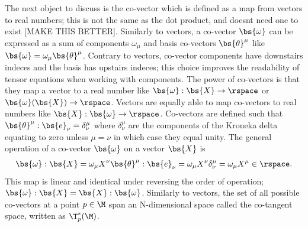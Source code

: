 The next object to discuss is the co-vector which is defined as a map from vectors to real numbers; this is not the same as the dot product, and doesnt need one to exist [MAKE THIS BETTER]. Similarly to vectors, a co-vector $\bs{\omega}$ can be expressed as a sum of components $\omega_\mu$ and basis co-vectors $\bs{\theta}^\mu$ like $\bs{\omega} = \omega_\mu \bs{\theta}^\mu$. Contrary to vectors, co-vector components have downstairs indeces and the basis has upstairs indeces; this choice improves the readability of tensor equations when working with components. The power of co-vectors is that they map a vector to a real number like $\bs{\omega}:\bs{X} \rightarrow \rspace$ or $\bs{\omega}(\bs{X}) \rightarrow \rspace$. Vectors are equally able to map co-vectors to real numbers like $\bs{X}:\bs{\omega}\rightarrow\rspace$. Co-vectors are defined such that $\bs{\theta}^\mu : \bs{e}_\nu = \delta^\mu_\nu$ where $\delta^\mu_\nu$ are the components of the Kroneka delta equating to zero unless $\mu=\nu$ in which case they equal unity. The general operation of a co-vector $\bs{\omega}$ on a vector $\bs{X}$ is
\begin{equation}
\bs{\omega}: \bs{X} = \omega_\mu X^\nu \bs{\theta}^\mu:\bs{e}_\nu = \omega_\mu X^\nu \delta^\mu_\nu = \omega_\mu X^\mu \in \rspace.
\end{equation}
This map is linear and identical under reversing the order of operation; $\bs{\omega} : \bs{X} = \bs{X} : \bs{\omega}$. Similarly to vectors, the set of all possible co-vectors at a point $p\in\M$ span an N-dimensional space called the co-tangent space, written as $\T^*_p(\M)$. 

